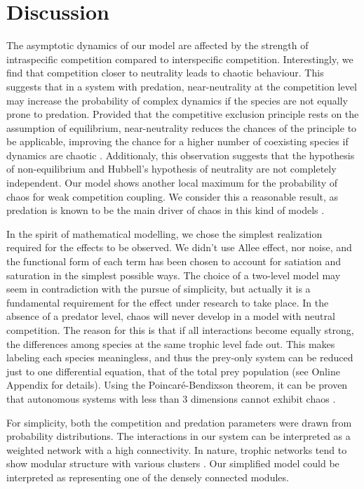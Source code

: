 \section{Discussion}
\label{sec:Discussion}
The asymptotic dynamics of our model are affected by the strength of intraspecific competition compared to interspecific competition. Interestingly, we find that competition closer to neutrality leads to chaotic behaviour. This suggests that in a system with predation, near-neutrality at the competition level may increase the probability of complex dynamics if the species are not equally prone to predation. Provided that the competitive exclusion principle rests on the assumption of equilibrium, near-neutrality reduces the chances of the principle to be applicable, improving the chance for a higher number of coexisting species if dynamics are chaotic \cite{Huisman1999}. Additionaly, this observation suggests that the hypothesis of non-equilibrium and Hubbell's hypothesis of neutrality are not completely independent. Our model shows another local maximum for the probability of chaos for weak competition coupling. We consider this a reasonable result, as predation is known to be the main driver of chaos in this kind of models \cite{Scheffer2004}.

In the spirit of mathematical modelling, we chose the simplest realization required for the effects to be observed. We didn't use Allee effect, nor noise, and the functional form of each term has been chosen to account for satiation and saturation in the simplest possible ways. The choice of a two-level model may seem in contradiction with the pursue of simplicity, but actually it is a fundamental requirement for the effect under research to take place. In the absence of a predator level, chaos will never develop in a model with neutral competition. The reason for this is that if all interactions become equally strong, the differences among species at the same trophic level fade out. This makes labeling each species meaningless, and thus the prey-only system can be reduced just to one differential equation, that of the total prey population (see Online Appendix for details). Using the Poincaré-Bendixson theorem, it can be proven that autonomous systems with less than $3$ dimensions cannot exhibit chaos \cite{Strogatz1994}.

For simplicity, both the competition and predation parameters were drawn from probability distributions. The interactions in our system can be interpreted as a weighted network with a high connectivity. In nature, trophic networks tend to show modular structure with various clusters \cite{Thebault2010}. Our simplified model could be interpreted as representing one of the densely connected modules.

